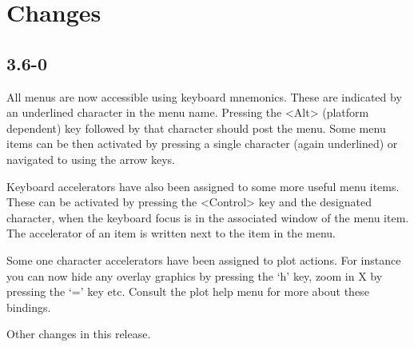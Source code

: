 \documentclass[twoside,11pt]{article}
\renewcommand{\_}{\texttt{\symbol{95}}}
\begin{document}
\section{Changes}

\subsection{3.6-0}

All menus are now accessible using keyboard mnemonics. These are indicated by
an underlined character in the menu name. Pressing the <Alt> (platform
dependent) key followed by that character should post the menu. Some menu
items can be then activated by pressing a single character (again underlined)
or navigated to using the arrow keys.

Keyboard accelerators have also been assigned to some more useful menu
items. These can be activated by pressing the <Control> key and the designated
character, when the keyboard focus is in the associated window of the menu
item. The accelerator of an item is written next to the item in the menu.

Some one character accelerators have been assigned to plot actions. For
instance you can now hide any overlay graphics by pressing the `h' key, zoom
in X by pressing the `=' key etc. Consult the plot help menu for more about
these bindings.

Other changes in this release.
\end{document}
